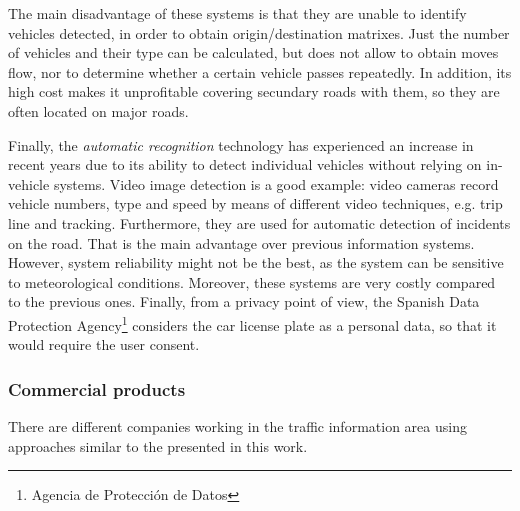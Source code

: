 \documentclass[preprint,authoryear,12pt]{elsarticle}
\begin{document}
The main disadvantage of these systems is that they are unable to identify vehicles detected, in order to obtain origin/destination matrixes.
Just the number of vehicles and their type can be calculated, but does not allow to obtain moves flow, nor to determine whether a certain vehicle passes repeatedly.
In addition, its high cost makes it unprofitable covering secundary roads with them, so they are often located on major roads.

Finally, the \emph{automatic recognition} technology has experienced an increase in recent years due to its ability to detect individual vehicles without relying on in-vehicle systems. 
Video image detection is a good example: video cameras record vehicle numbers, type and speed by means of different video techniques, e.g. trip line and tracking. 
Furthermore, they are used for automatic detection of incidents on the road. 
That is the main advantage over previous information systems.
However, system reliability might not be the best, as the system can be sensitive to meteorological conditions.
Moreover, these systems are very costly compared to the previous ones.
Finally, from a privacy point of view, the Spanish Data Protection Agency\footnote{Agencia de Protección de Datos} considers the car license plate as a personal data, so that it would require the user consent.




\subsubsection{Commercial products}
There are different companies working in the traffic information area using approaches similar to the presented in this work.
\end{document}
